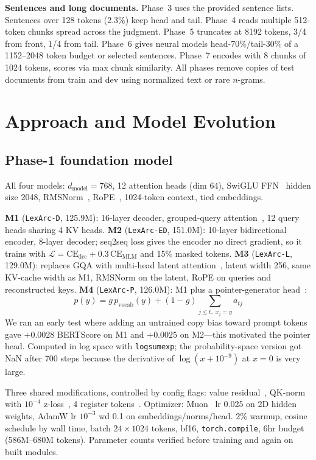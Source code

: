 \documentclass[11pt, oneside]{article}
\begin{document}
\textbf{Sentences and long documents.} Phase~3 uses the provided sentence lists. Sentences over 128
tokens (2.3\%) keep head and tail. Phase~4 reads multiple 512-token chunks spread across the judgment.
Phase~5 truncates at 8192 tokens, 3/4 from front, 1/4 from tail. Phase~6 gives neural models
head-70\%/tail-30\% of a 1152--2048 token budget or selected sentences. Phase~7 encodes with 8 chunks of
1024 tokens, scores via max chunk similarity. All phases remove copies of test documents from train and
dev using normalized text or rare $n$-grams.

\section{Approach and Model Evolution}
\subsection{Phase-1 foundation model}
\label{sec:p1}
All four models: $d_{\text{model}} = 768$, 12 attention heads (dim 64), SwiGLU FFN~\citep{shazeer2020glu}
hidden size 2048, RMSNorm~\citep{zhang2019rmsnorm}, RoPE~\citep{su2021roformer}, 1024-token context,
tied embeddings.

\textbf{M1} (\texttt{LexArc-D}, 125.9M): 16-layer decoder, grouped-query attention~\citep{ainslie2023gqa},
12 query heads sharing 4 KV heads. \textbf{M2} (\texttt{LexArc-ED}, 151.0M): 10-layer bidirectional
encoder, 8-layer decoder; seq2seq loss gives the encoder no direct gradient, so it trains with
$\mathcal{L} = \mathrm{CE}_{\text{dec}} + 0.3\,\mathrm{CE}_{\text{MLM}}$ and 15\% masked tokens.
\textbf{M3} (\texttt{LexArc-L}, 129.0M): replaces GQA with multi-head latent
attention~\citep{deepseek2024v2}, latent width 256, same KV-cache width as M1, RMSNorm on the latent,
RoPE on queries and reconstructed keys. \textbf{M4} (\texttt{LexArc-P}, 126.0M): M1 plus a
pointer-generator head~\citep{see2017pointer}:
\[
p(y) = g\,p_{\text{vocab}}(y) + (1-g)\sum_{j \le t,\; x_j = y} a_{tj}
\]
We ran an early test where adding an untrained copy bias toward prompt tokens gave $+0.0028$ BERTScore
on M1 and $+0.0025$ on M2---this motivated the pointer head. Computed in log space with
\texttt{logsumexp}; the probability-space version got NaN after 700 steps because the derivative of
$\log(x + 10^{-9})$ at $x=0$ is very large.

Three shared modifications, controlled by config flags: value residual~\citep{zhou2024value}, QK-norm
with $10^{-4}$ z-loss~\citep{dehghani2023vit22b}, 4 register tokens~\citep{darcet2024registers}.
Optimizer: Muon~\citep{jordan2024muon} lr 0.025 on 2D hidden weights, AdamW lr $10^{-3}$ wd 0.1 on
embeddings/norms/head. 2\% warmup, cosine schedule by wall time, batch $24\times1024$ tokens, bf16,
\texttt{torch.compile}, 6hr budget (586M--680M tokens). Parameter counts verified before training and
again on built modules.
\end{document}
